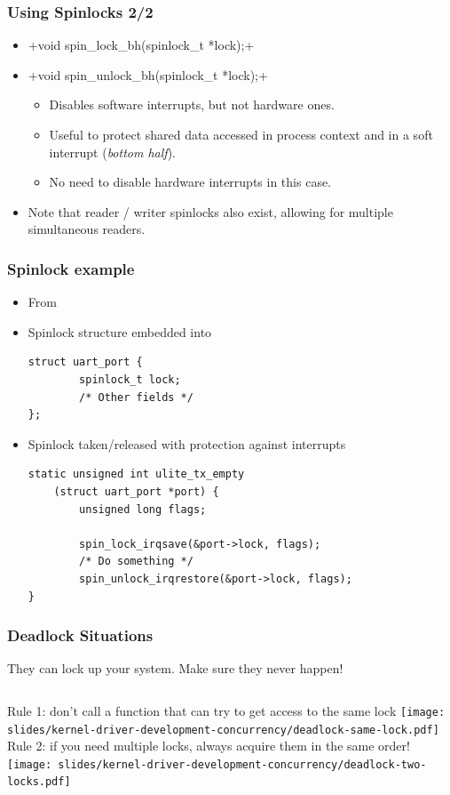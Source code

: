 \begin{frame}[fragile]
  \frametitle{Using Spinlocks 2/2}
  \begin{itemize}
  \item {}+void spin_lock_bh(spinlock_t *lock);+
  \item {}+void spin_unlock_bh(spinlock_t *lock);+
    \begin{itemize}
    \item Disables software interrupts, but not hardware ones.
    \item Useful to protect shared data accessed in process context
      and in a soft interrupt (\emph{bottom half}).
    \item No need to disable hardware interrupts in this case.
    \end{itemize}
  \item Note that reader / writer spinlocks also exist, allowing
	for multiple simultaneous readers.
  \end{itemize}
\end{frame}

\begin{frame}[fragile]
  \frametitle{Spinlock example}
  \begin{itemize}
  \item From 
  \item Spinlock structure embedded into 
    \begin{block}{}
    \begin{verbatim}
struct uart_port {
        spinlock_t lock;
        /* Other fields */
};
    \end{verbatim}
    \end{block}
  \item Spinlock taken/released with protection against interrupts
    \begin{block}{}
    \begin{verbatim}
static unsigned int ulite_tx_empty
    (struct uart_port *port) {
        unsigned long flags;

        spin_lock_irqsave(&port->lock, flags);
        /* Do something */
        spin_unlock_irqrestore(&port->lock, flags);
}
    \end{verbatim}
    \end{block}
  \end{itemize}
\end{frame}

\begin{frame}
  \frametitle{Deadlock Situations}
  They can lock up your system. Make sure they never happen!
  \vspace{0.5cm}
  \begin{columns}
      Rule 1: don't call a function that can try to get access to the same lock
      \texttt{[image: slides/kernel-driver-development-concurrency/deadlock-same-lock.pdf]}
      Rule 2: if you need multiple locks, always acquire them in the same order!
      \texttt{[image: slides/kernel-driver-development-concurrency/deadlock-two-locks.pdf]}
  \end{columns}
\end{frame}

